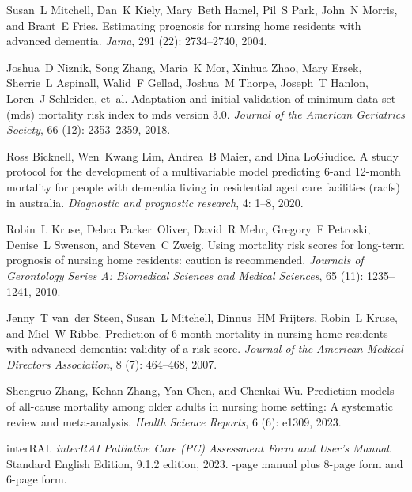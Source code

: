 \documentclass{article}
\begin{document}
\begin{thebibliography}{60}
Susan~L Mitchell, Dan~K Kiely, Mary~Beth Hamel, Pil~S Park, John~N Morris, and
  Brant~E Fries.
\newblock Estimating prognosis for nursing home residents with advanced
  dementia.
\newblock \emph{Jama}, 291 (22): 2734--2740, 2004.

Joshua~D Niznik, Song Zhang, Maria~K Mor, Xinhua Zhao, Mary Ersek, Sherrie~L
  Aspinall, Walid~F Gellad, Joshua~M Thorpe, Joseph~T Hanlon, Loren~J
  Schleiden, et~al.
\newblock Adaptation and initial validation of minimum data set (mds) mortality
  risk index to mds version 3.0.
\newblock \emph{Journal of the American Geriatrics Society}, 66
  (12): 2353--2359, 2018.

Ross Bicknell, Wen~Kwang Lim, Andrea~B Maier, and Dina LoGiudice.
\newblock A study protocol for the development of a multivariable model
  predicting 6-and 12-month mortality for people with dementia living in
  residential aged care facilities (racfs) in australia.
\newblock \emph{Diagnostic and prognostic research}, 4: 1--8, 2020.

Robin~L Kruse, Debra Parker~Oliver, David~R Mehr, Gregory~F Petroski, Denise~L
  Swenson, and Steven~C Zweig.
\newblock Using mortality risk scores for long-term prognosis of nursing home
  residents: caution is recommended.
\newblock \emph{Journals of Gerontology Series A: Biomedical Sciences and
  Medical Sciences}, 65 (11): 1235--1241, 2010.

Jenny~T van~der Steen, Susan~L Mitchell, Dinnus~HM Frijters, Robin~L Kruse, and
  Miel~W Ribbe.
\newblock Prediction of 6-month mortality in nursing home residents with
  advanced dementia: validity of a risk score.
\newblock \emph{Journal of the American Medical Directors Association},
  8 (7): 464--468, 2007.

Shengruo Zhang, Kehan Zhang, Yan Chen, and Chenkai Wu.
\newblock Prediction models of all-cause mortality among older adults in
  nursing home setting: A systematic review and meta-analysis.
\newblock \emph{Health Science Reports}, 6 (6): e1309, 2023.

interRAI.
\newblock \emph{interRAI Palliative Care (PC) Assessment Form and User’s
  Manual}.
\newblock Standard English Edition, 9.1.2 edition, 2023.
-page manual plus 8-page form and 6-page form.

\end{thebibliography}
\end{document}
